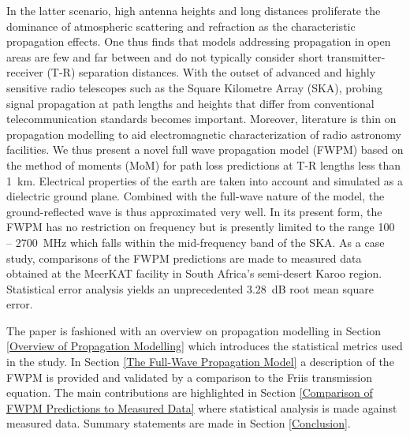 \documentclass[10pt,journal,twoside]{IEEEtran}
\begin{document}
In the latter scenario, high antenna heights and long distances proliferate the dominance of atmospheric scattering and refraction as the characteristic propagation effects. %
One thus finds that models addressing propagation in open areas are few and far between and do not typically consider short transmitter-receiver (T-R) separation distances. With the outset of advanced and highly sensitive radio telescopes such as the Square Kilometre Array (SKA), probing signal propagation at path lengths and heights that differ from conventional telecommunication standards becomes important. Moreover, literature is thin on propagation modelling to aid electromagnetic characterization of radio astronomy facilities. %
We thus present a novel full wave propagation model (FWPM) based on the method of moments (MoM) for path loss predictions at T-R lengths less than \SI{1}{km}. Electrical properties of the earth are taken into account and simulated as a dielectric ground plane. Combined with the full-wave nature of the model, the ground-reflected wave is thus approximated very well. In its present form, the FWPM has no restriction on frequency but is presently limited to the range \SI{100}{} -- \SI{2700}{MHz} which falls within the mid-frequency band of the SKA. As a case study, comparisons of the FWPM predictions are made to measured data obtained at the  MeerKAT facility in South Africa's semi-desert Karoo region. Statistical error analysis yields an unprecedented \SI{3.28}{dB} root mean square error.

The paper is fashioned with an overview on propagation modelling in Section \ref{Overview of Propagation Modelling} which introduces the statistical metrics used in the study. In Section \ref{The Full-Wave Propagation Model} a description of the FWPM is provided and validated by a comparison to the Friis transmission equation. The main contributions are highlighted in Section \ref{Comparison of FWPM Predictions to Measured Data} where statistical analysis is made against measured data. Summary statements are made in Section \ref{Conclusion}.  
\end{document}
